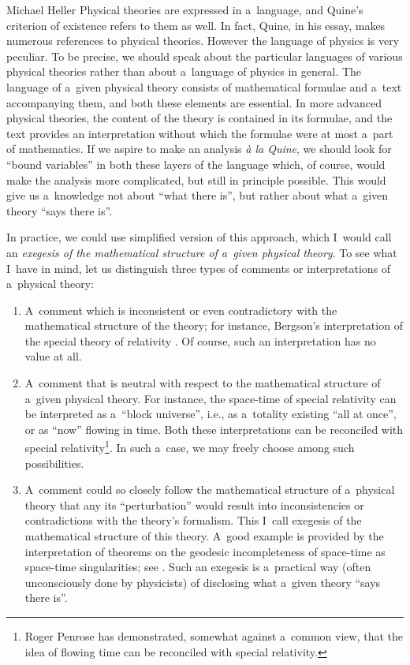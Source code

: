 \begin{artengenv}{Michael Heller}
Physical theories are expressed in a~language, and Quine’s criterion of existence refers to them as well. In fact,
Quine, in his essay, makes numerous references to physical theories. However the language of physics is very peculiar.
To be precise, we should speak about the particular languages of various physical theories rather than about a~language
of physics in general. The language of a~given physical theory consists of mathematical formulae and a~text
accompanying them, and both these elements are essential. In more advanced physical theories, the content of the theory
is contained in its formulae, and the text provides an interpretation without which the formulae were at most a~part of
mathematics. If we aspire to make an analysis \textit{à la Quine}, we should look for ``bound variables'' in both these
layers of the language which, of course, would make the analysis more complicated, but still in principle possible.
This would give us a~knowledge not about ``what there is'', but rather about what a~given theory ``says there is''.

In practice, we could use simplified version of this approach, which I~would call an \textit{exegesis of the
mathematical structure of a~given physical theory}. To see what I~have in mind, let us distinguish three types of
comments or interpretations of a~physical theory:

\begin{enumerate}
\item A~comment which is inconsistent or even contradictory with the mathematical structure of the theory; for instance,
Bergson’s interpretation of the special theory of relativity \parencite{bergson_duree_1922}. Of course, such
an interpretation has no value at all.
\item A~comment that is neutral with respect to the mathematical structure of a~given physical theory. For instance, the
space-time of special relativity can be interpreted as a~``block universe'', i.e., as a~totality existing ``all at once'',
or as ``now'' flowing in time. Both these interpretations can be reconciled with special relativity\footnote{Roger
Penrose \parencite*{hawking_singularities_1979} has demonstrated, somewhat against a~common view, that the idea of flowing time
can be reconciled with special relativity.}. In such a~case, we may freely choose among such
possibilities.
\item A~comment could so closely follow the mathematical structure of a~physical theory that any its ``perturbation''
would result into inconsistencies or contradictions with the theory’s formalism. This I~call exegesis of the
mathematical structure of this theory. A~good example is provided by the interpretation of theorems on the geodesic
incompleteness of space-time as space-time singularities; see \parencite{hawking_large_1973}. Such
an exegesis is a~practical way (often unconsciously done by physicists) of disclosing what a~given theory ``says there
is''.
\end{enumerate}


\end{artengenv}

